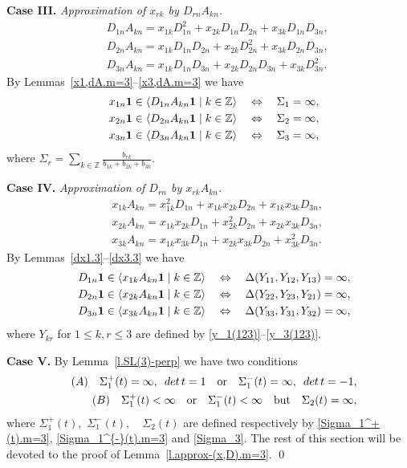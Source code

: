 \documentclass[preprint,12pt]{elsarticle}
\numberwithin{equation}{section}
\begin{document}
\begin{pf}
{\bf Case III.} {\it  Approximation of $x_{rk}$ by $D_{rn}A_{kn}$.}
\begin{eqnarray*}
&&D_{1n}A_{kn}=x_{1k}D_{1n}^2+x_{2k}D_{1n}D_{2n}+x_{3k}D_{1n}D_{3n},\\
&&D_{2n}A_{kn}=x_{1k}D_{1n}D_{2n}+x_{2k}D_{2n}^2  +x_{3k}D_{2n}D_{3n},\\
&&D_{3n}A_{kn}=x_{1k}D_{1n}D_{3n}+x_{2k}D_{2n}D_{3n}+x_{3k}D_{3n}^2.
\end{eqnarray*}
By Lemmas~\ref{x1,dA.m=3}--\ref{x3,dA.m=3}  we have 
\begin{eqnarray*}
&& 
x_{1n}{\bf 1}\in\langle D_{1n}A_{kn}{\bf 1}\mid k\in {\mathbb Z}\rangle
\quad\Leftrightarrow\quad 
\Sigma_1=\infty,\\
&& 
x_{2n}{\bf 1}\in\langle D_{2n}A_{kn}{\bf 1}\mid k\in {\mathbb Z}\rangle
\quad\Leftrightarrow\quad 
\Sigma_2=\infty,\\
&& 
x_{3n}{\bf 1}\in\langle D_{3n}A_{kn}{\bf 1}\mid k\in {\mathbb Z}\rangle
\quad\Leftrightarrow\quad 
\Sigma_3=\infty,
\end{eqnarray*}
where $\Sigma_r=\sum_{k\in \mathbb Z}\frac{b_{rk}}{b_{1k}+b_{2k}+b_{3k}}.$


{\bf Case IV.} {\it  Approximation of $D_{rn}$ by $x_{rk}A_{kn}$.}
\begin{eqnarray*}
&&x_{1k}A_{kn}=x^2_{1k}D_{1n}+x_{1k}x_{2k}D_{2n}+x_{1k}x_{3k}D_{3n},\\
&&x_{2k}A_{kn}=x_{1k}x_{2k}D_{1n}+x_{2k}^2D_{2n}+x_{2k}x_{3k}D_{3n},\\
&&x_{3k}A_{kn}=x_{1k}x_{3k}D_{1n}+x_{2k}x_{3k}D_{2n}+x_{3k}^2D_{3n}.
\end{eqnarray*}
By Lemmas~\ref{dx1.3}--\ref{dx3.3}  we have 
\begin{eqnarray*}
&& 
D_{1n}{\bf 1}\in\langle x_{1k}A_{kn}{\bf 1}\mid k\in {\mathbb Z}\rangle
\quad\Leftrightarrow\quad 
\Delta(Y_{11},Y_{12},Y_{13})=\infty,\\
&& 
D_{2n}{\bf 1}\in\langle x_{2k}A_{kn}{\bf 1}\mid k\in {\mathbb Z}\rangle
\quad\Leftrightarrow\quad 
\Delta(Y_{22},Y_{23},Y_{21})=\infty,\\
&& 
D_{3n}{\bf 1}\in\langle x_{3k}A_{kn}{\bf 1}\mid k\in {\mathbb Z}\rangle
\quad\Leftrightarrow\quad 
\Delta(Y_{33},Y_{31},Y_{32})=\infty,
\end{eqnarray*}
where $Y_{kr}$ for $1\leq k,r\leq 3$ are defined by 
\eqref{y_1(123)}--\eqref{y_3(123)}.



{\bf Case V.}  By Lemma~\ref{l.SL(3)-perp} we have two conditions 
\begin{eqnarray}
\nonumber
&&(A)\quad \Sigma_1^+(t)=\infty,\,\,\,{\rm det}\,t=1\quad \text{or} \quad \Sigma_1^-(t)=\infty,\,\,\,{\rm det}\,t=-1,\\
\label{(A)(B).m=3}
&&(B)\quad \Sigma_1^+(t)<\infty \quad \text{or}\quad  \Sigma_1^-(t)<\infty\quad \text{but}\quad\Sigma_2(t)=\infty,
\end{eqnarray}
where $\Sigma_1^+(t),\,\,\Sigma_1^{-}(t),\quad\Sigma_2(t)$ are defined respectively by 
\eqref{Sigma_1^+(t).m=3}, \eqref{Sigma_1^{-}(t).m=3}  
and \eqref{Sigma_3}.
The rest
of this section will be devoted to the proof of Lemma~\ref{l.approx-(x,D).m=3}.
\qed\end{pf}
\end{document}
